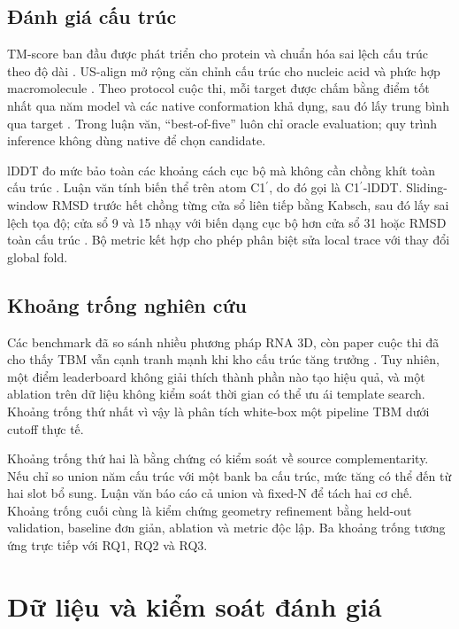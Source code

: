 \documentclass[12pt,a4paper,oneside]{report}
\newcommand{\cprime}{C1$^{\prime}$}
\begin{document}
\section{Đánh giá cấu trúc}

TM-score ban đầu được phát triển cho protein và chuẩn hóa sai lệch cấu trúc theo độ dài
\cite{tm_score}. US-align mở rộng căn chỉnh cấu trúc cho nucleic acid và phức hợp
macromolecule \cite{usalign}. Theo protocol cuộc thi, mỗi target được chấm bằng điểm tốt
nhất qua năm model và các native conformation khả dụng, sau đó lấy trung bình qua target
\cite{competition_paper}. Trong luận văn, ``best-of-five'' luôn chỉ oracle evaluation;
quy trình inference không dùng native để chọn candidate.

lDDT đo mức bảo toàn các khoảng cách cục bộ mà không cần chồng khít toàn cấu trúc
\cite{lddt}. Luận văn tính biến thể trên atom \cprime{}, do đó gọi là
\cprime{}-lDDT. Sliding-window RMSD trước hết chồng từng cửa sổ liên tiếp bằng Kabsch,
sau đó lấy sai lệch tọa độ; cửa sổ 9 và 15 nhạy với biến dạng cục bộ hơn cửa sổ 31 hoặc
RMSD toàn cấu trúc \cite{kabsch}. Bộ metric kết hợp cho phép phân biệt sửa local trace
với thay đổi global fold.

\section{Khoảng trống nghiên cứu}

Các benchmark đã so sánh nhiều phương pháp RNA 3D, còn paper cuộc thi đã cho thấy TBM
vẫn cạnh tranh mạnh khi kho cấu trúc tăng trưởng
\cite{state_of_rnart,competition_paper}. Tuy nhiên, một điểm leaderboard không giải
thích thành phần nào tạo hiệu quả, và một ablation trên dữ liệu không kiểm soát thời gian
có thể ưu ái template search. Khoảng trống thứ nhất vì vậy là phân tích white-box một
pipeline TBM dưới cutoff thực tế.

Khoảng trống thứ hai là bằng chứng có kiểm soát về source complementarity. Nếu chỉ so
union năm cấu trúc với một bank ba cấu trúc, mức tăng có thể đến từ hai slot bổ sung.
Luận văn báo cáo cả union và fixed-N để tách hai cơ chế. Khoảng trống cuối cùng là kiểm
chứng geometry refinement bằng held-out validation, baseline đơn giản, ablation và metric
độc lập. Ba khoảng trống tương ứng trực tiếp với RQ1, RQ2 và RQ3.

\chapter{Dữ liệu và kiểm soát đánh giá}
\label{chap:data_vi}
\end{document}
